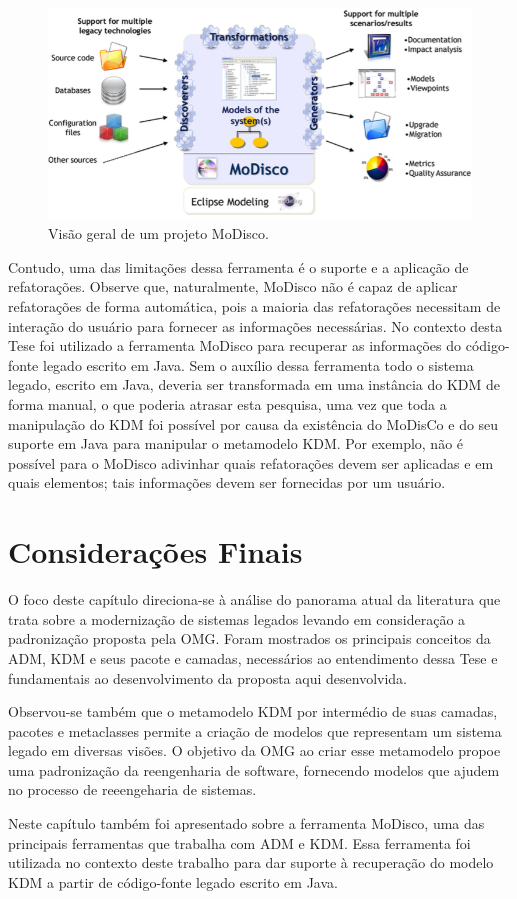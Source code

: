 \begin{figure}[!ht]
	\centering
	\includegraphics[scale=0.55]{images/modiscoAllArtefacts.png}
	\caption{Visão geral de um projeto MoDisco.}
	\label{fig:modisco_allArtefacts}
\end{figure}

Contudo, uma das limitações dessa ferramenta é o suporte e a aplicação de refatorações. Observe que, naturalmente, MoDisco não é capaz de aplicar refatorações de forma automática, pois a maioria das refatorações necessitam de interação do usuário para fornecer as informações necessárias. No contexto desta Tese foi utilizado a ferramenta MoDisco para recuperar as informações do código-fonte legado escrito em Java. Sem o auxílio dessa ferramenta todo o sistema legado, escrito em Java, deveria ser transformada em uma instância do KDM de forma manual, o que poderia atrasar esta pesquisa, uma vez que toda a manipulação do KDM foi possível por causa da existência do MoDisCo e do seu suporte em Java para manipular o metamodelo KDM. Por exemplo, não é possível para o MoDisco adivinhar quais refatorações devem ser aplicadas e em quais elementos; tais informações devem ser fornecidas por um usuário.

\section{Considerações Finais}\label{sec:consideracoes_finais}

O foco deste capítulo direciona-se à análise do panorama atual da literatura que trata sobre a modernização de sistemas legados levando em consideração a padronização proposta pela OMG. Foram mostrados os principais conceitos da ADM, KDM e seus pacote e camadas, necessários ao entendimento dessa Tese e fundamentais ao desenvolvimento da proposta aqui desenvolvida.

Observou-se também que o metamodelo KDM por intermédio de suas camadas, pacotes e metaclasses permite a criação de modelos que representam um sistema legado em diversas visões. O objetivo da OMG ao criar esse metamodelo propoe uma padronização da reengenharia de software, fornecendo modelos que ajudem no processo de reeengeharia de sistemas.

Neste capítulo também foi apresentado sobre a ferramenta MoDisco, uma das principais ferramentas que trabalha com ADM e KDM. Essa ferramenta foi utilizada no contexto deste trabalho para dar suporte à recuperação do modelo KDM a partir de código-fonte legado escrito em Java.